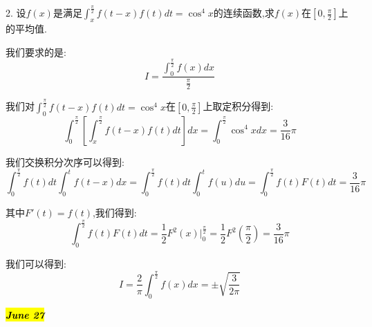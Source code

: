2. 设$f(x)$是满足$\int_{x}^{\frac{\pi}{2}}f(t-x)f(t)dt=\cos^4 x$的连续函数,求$f(x)$在$[0,\frac{\pi}{2}]$上的平均值.
\begin{solution}
	
	我们要求的是: $$I=\dfrac{\int_{0}^{\frac{\pi}{2}}f(x)dx}{\frac{\pi}{2}}$$
	
	我们对$\int_{0}^{\frac{\pi}{2}}f(t-x)f(t)dt=\cos^4 x$在$[0,\frac{\pi}{2}]$上取定积分得到: 
	$$\int_{0}^{\frac{\pi}{2}}\left[ \int_{x}^{\frac{\pi}{2}}f(t-x)f(t)dt\right] dx=\int_{0}^{\frac{\pi}{2}}\cos^4 xdx=\dfrac{3}{16}\pi$$
	
	我们交换积分次序可以得到: 
	$$\int_{0}^{\frac{\pi}{2}}f(t)dt\int_{0}^{t}f(t-x)dx=\int_{0}^{\frac{\pi}{2}}f(t)dt\int_{0}^{t}f(u)du=\int_{0}^{\frac{\pi}{2}}f(t)F(t)dt=\dfrac{3}{16}\pi$$
	
	其中$F'(t)=f(t)$,我们得到: 
	$$\int_{0}^{\frac{\pi}{2}}f(t)F(t)dt=\dfrac{1}{2}F^{2}(x)|_{0}^{\frac{\pi}{2}}=\dfrac{1}{2}F^2(\frac{\pi}{2})=\dfrac{3}{16}\pi$$
	
	我们可以得到: 
	$$I=\dfrac{2}{\pi}\int_{0}^{\frac{\pi}{2}}f(x)dx=\pm\sqrt{\dfrac{3}{2\pi}}$$
\end{solution}

\hl{\textbf{\textit{June 27}}}

